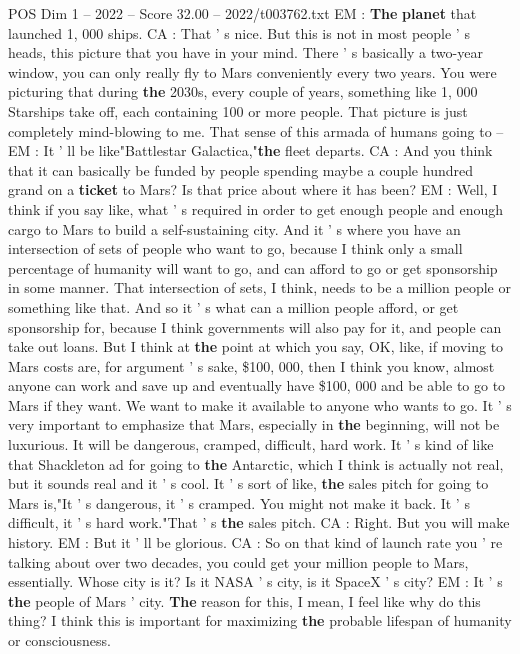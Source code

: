\begin{textsample}{POS Dim 1 – 2022 – Score 32.00 – 2022/t003762.txt}
EM : \textbf{The} \textbf{planet} that launched 1, 000 ships.
CA : That ' s nice.
But this is not in most people ' s heads, this picture that you have in your mind.
There ' s basically a two-year window, you can only really fly to Mars conveniently every two years.
You were picturing that during \textbf{the} 2030s, every couple of years, something like 1, 000 Starships take off, each containing 100 or more people.
That picture is just completely mind-blowing to me.
That sense of this armada of humans going to -- EM : It ' ll be like"Battlestar Galactica,"\textbf{the} fleet departs.
CA : And you think that it can basically be funded by people spending maybe a couple hundred grand on a \textbf{ticket} to Mars?
Is that price about where it has been?
EM : Well, I think if you say like, what ' s required in order to get enough people and enough cargo to Mars to build a self-sustaining city.
And it ' s where you have an intersection of sets of people who want to go, because I think only a small percentage of humanity will want to go, and can afford to go or get sponsorship in some manner.
That intersection of sets, I think, needs to be a million people or something like that.
And so it ' s what can a million people afford, or get sponsorship for, because I think governments will also pay for it, and people can take out loans.
But I think at \textbf{the} point at which you say, OK, like, if moving to Mars costs are, for argument ' s sake, \$100, 000, then I think you know, almost anyone can work and save up and eventually have \$100, 000 and be able to go to Mars if they want.
We want to make it available to anyone who wants to go.
It ' s very important to emphasize that Mars, especially in \textbf{the} beginning, will not be luxurious.
It will be dangerous, cramped, difficult, hard work.
It ' s kind of like that Shackleton ad for going to \textbf{the} Antarctic, which I think is actually not real, but it sounds real and it ' s cool.
It ' s sort of like, \textbf{the} sales pitch for going to Mars is,"It ' s dangerous, it ' s cramped.
You might not make it back.
It ' s difficult, it ' s hard work."That ' s \textbf{the} sales pitch.
CA : Right.
But you will make history.
EM : But it ' ll be glorious.
CA : So on that kind of launch rate you ' re talking about over two decades, you could get your million people to Mars, essentially.
Whose city is it?
Is it NASA ' s city, is it SpaceX ' s city?
EM : It ' s \textbf{the} people of Mars ' city. \textbf{The} reason for this, I mean, I feel like why do this thing?
I think this is important for maximizing \textbf{the} probable lifespan of humanity or consciousness.

\end{textsample}
